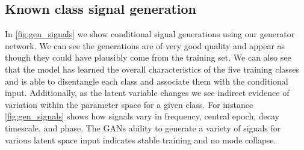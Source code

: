 \documentclass[12pt]{iopart}
\begin{document}
\subsection{Known class signal generation}
In \cref{fig:gen_signals} we show conditional signal generations using our generator network. We can see the generations are of very good quality and appear as though they could have plausibly come from the training set. We can also see that the model has learned the overall characteristics of the five training classes and is able to disentangle each class and associate them with the conditional input. Additionally, as the latent variable changes we see indirect evidence of variation within the parameter space for a given class. For instance \cref{fig:gen_signals} shows how signals vary in frequency, central epoch, decay timescale, and phase. The \acp{GAN} ability to generate a variety of signals for various latent space input indicates stable training and no mode collapse. 
\end{document}
